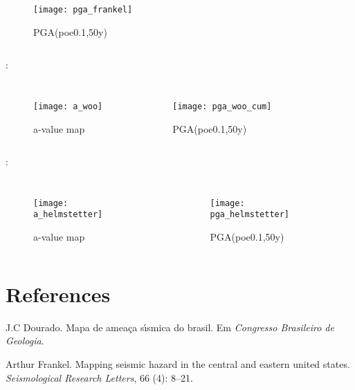 \documentclass[final]{beamer}
\begin{document}
\begin{poster}
\begin{columns}[t,totalwidth=\textwidth]
		\begin{figure}[H]
		  \centering
		  \texttt{[image: pga\_frankel]} 
		  \caption{PGA(poe0.1,50y)}
		  \label{fig:pga_fran} 
		\end{figure}
\end{columns}

\footnotesize \textbf{\citet{woo_1996}}:
\begin{columns}[t,totalwidth=\textwidth]
	\begin{figure}[H]
	  \centering
	  \texttt{[image: a\_woo]} 
	  \caption{a-value map}
	  \label{fig:a_woo} 
	\end{figure}
	\begin{figure}[H]
		\centering
		\texttt{[image: pga\_woo\_cum]} 
		\caption{PGA(poe0.1,50y)}
		\label{fig:pga_woo_cum} 
	\end{figure}
\end{columns}

\footnotesize \textbf{\citet{helmstetter_2012}}:
\begin{columns}[t,totalwidth=\textwidth]
	\begin{figure}[H]
	  \centering
	  \texttt{[image: a\_helmstetter]} 
	  \caption{a-value map}
	  \label{fig:helm_r} 
	\end{figure}
	\begin{figure}[H]
	  \centering
	  \texttt{[image: pga\_helmstetter]} 
	  \caption{PGA(poe0.1,50y)}
	  \label{fig:helm_h} 
	\end{figure}
\end{columns}


\section{References}
	\scriptsize
%	

J.C Dourado.
Mapa de amea{\c c}a s{\'\i}smica do brasil.
Em \emph{Congresso Brasileiro de Geologia}.

Arthur Frankel.
Mapping seismic hazard in the central and eastern united states.
\emph{Seismological Research Letters}, 66 (4):
  8--21.


\end{poster}
\end{document}
